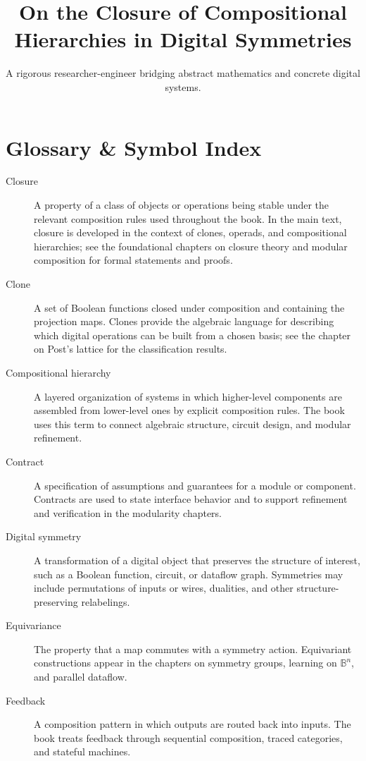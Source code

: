 \documentclass[11pt]{article}
\title{On the Closure of Compositional Hierarchies in Digital Symmetries}
\author{A rigorous researcher-engineer bridging abstract mathematics and concrete digital systems.}
\begin{document}
\section*{Glossary \& Symbol Index}

\begin{description}
  \item[Closure] A property of a class of objects or operations being stable under the relevant composition rules used throughout the book. In the main text, closure is developed in the context of clones, operads, and compositional hierarchies; see the foundational chapters on closure theory and modular composition for formal statements and proofs.

  \item[Clone] A set of Boolean functions closed under composition and containing the projection maps. Clones provide the algebraic language for describing which digital operations can be built from a chosen basis; see the chapter on Post's lattice for the classification results.

  \item[Compositional hierarchy] A layered organization of systems in which higher-level components are assembled from lower-level ones by explicit composition rules. The book uses this term to connect algebraic structure, circuit design, and modular refinement.

  \item[Contract] A specification of assumptions and guarantees for a module or component. Contracts are used to state interface behavior and to support refinement and verification in the modularity chapters.

  \item[Digital symmetry] A transformation of a digital object that preserves the structure of interest, such as a Boolean function, circuit, or dataflow graph. Symmetries may include permutations of inputs or wires, dualities, and other structure-preserving relabelings.

  \item[Equivariance] The property that a map commutes with a symmetry action. Equivariant constructions appear in the chapters on symmetry groups, learning on \(\mathbb{B}^n\), and parallel dataflow.

  \item[Feedback] A composition pattern in which outputs are routed back into inputs. The book treats feedback through sequential composition, traced categories, and stateful machines.


\end{description}
\end{document}
